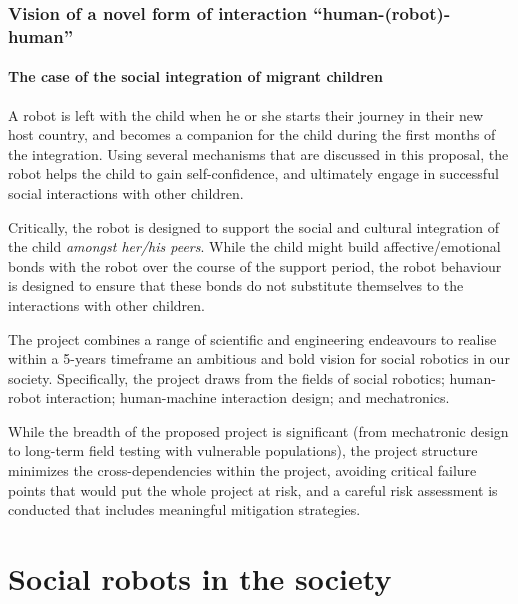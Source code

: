 \documentclass[11pt]{report}
\begin{document}
\subsubsection{Vision of a novel form of interaction ``human-(robot)-human''}

\paragraph{The case of the social integration of migrant children}

A robot is left with the child when he or she starts their journey in
their new host country, and becomes a companion for the child during the
first months of the integration. Using several mechanisms that are
discussed in this proposal, the robot helps the child to gain
self-confidence, and ultimately engage in successful social interactions
with other children.

Critically, the robot is designed to support the social and cultural
integration of the child \emph{amongst her/his peers}. While the child
might build affective/emotional bonds with the robot over the course of
the support period, the robot behaviour is designed to ensure that these
bonds do not substitute themselves to the interactions with other
children.

The project combines a range of scientific and engineering endeavours to
realise within a 5-years timeframe an ambitious and bold vision for
social robotics in our society. Specifically, the project draws from the
fields of social robotics; human-robot interaction; human-machine
interaction design; and mechatronics.

While the breadth of the proposed project is significant (from
mechatronic design to long-term field testing with vulnerable
populations), the project structure minimizes the cross-dependencies
within the project, avoiding critical failure points that would put the
whole project at risk, and a careful risk assessment is conducted that
includes meaningful mitigation strategies.



\section{Social robots in the society}
\end{document}
